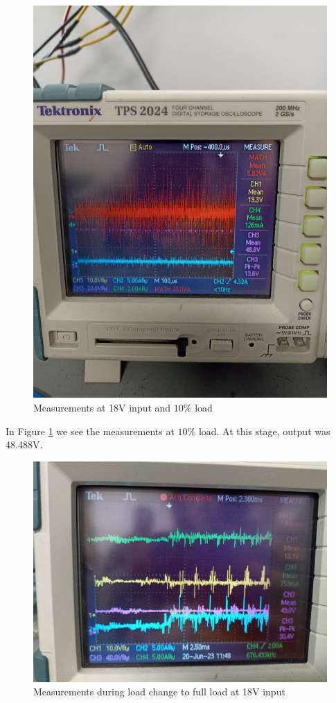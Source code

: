 \documentclass[12pt]{article}
\begin{document}
    \begin{figure}[H]
        \centering
        \includegraphics[width = \textwidth]{img/in1810perload.jpeg}
        \caption{Measurements at 18V input and $10\%$ load}
        \label{fig:meas-1}
    \end{figure}

    In Figure \ref{fig:meas-1} we see the measurements at $10\%$ load. At this stage, output was 48.488V.

    \begin{figure}[H]
        \centering
        \includegraphics[width = \textwidth]{img/meas-load-change-to-76.jpeg}
        \caption{Measurements during load change to full load at 18V input}
        \label{fig:load-respo-76}
    \end{figure}
    
\end{document}
